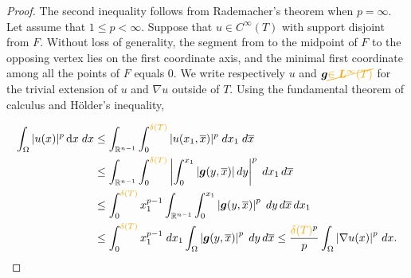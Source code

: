 \documentclass[10pt,letterpaper]{article}
\newcommand\cye[1]{%
  \protect\leavevmode
  \begingroup
    \color{red!35!yellow}%
    #1%
  \endgroup
}
\begin{document}
\begin{proof}
    The second inequality follows from Rademacher's theorem when $p = \infty$.
    Let assume that $1 \leq p < \infty$. 
    Suppose that $u \in C^{\infty}(T)$ with support disjoint from $F$.
    Without loss of generality, 
    the segment from to the midpoint of $F$ to the opposing vertex lies on the first coordinate axis,
    and the minimal first coordinate among all the points of $F$ equals $0$. 
    We write \cye{respectively $u$ and} $\bfg \cye{\cancel{\in \bfL^{\infty}(T)}}$ for the trivial extension of \cye{$u$ and} $\nabla u$ outside of $T$.
    \cye{Using the fundamental theorem of calculus and H\"older's inequality,} 
    \begin{align*}
        \int_{\Omega} |u(x)|^{p} \diff x \;dx
        &\leq
        \int_{\bbR^{n-1}} \int_{0}^{\cye{\diam(T)}} |u( x_{1}, \overline x )|^{p} \;dx_{1} \;d\overline{x}
        \\&
        \leq
        \int_{\bbR^{n-1}} \int_{0}^{\cye{\diam(T)}} \left| \int_{0}^{x_{1}} |\bfg( y, \overline x )| \,dy \right|^{p} \;dx_{1} \,d\overline{x}
        \\&
        \leq
        \int_{0}^{\cye{\diam(T)}} x_{1}^{p-1} \int_{\bbR^{n-1}} \int_{0}^{x_{1}} \left| \bfg( y, \overline x ) \right|^{p} \;dy \,d\overline{x} \,dx_{1}
        \\&
        \leq
        \int_{0}^{\cye{\diam(T)}} x_{1}^{p-1} \;dx_1 
        \int_{\Omega} \left| \bfg( y, \overline x ) \right|^{p} \;dy \,d\overline{x} 
        \leq
        \frac{\cye{\diam(T)}^{p}}{p} \int_{\Omega} \left| \nabla u( x ) \right|^{p} \,dx
        .
    \end{align*}


\end{proof}
\end{document}
